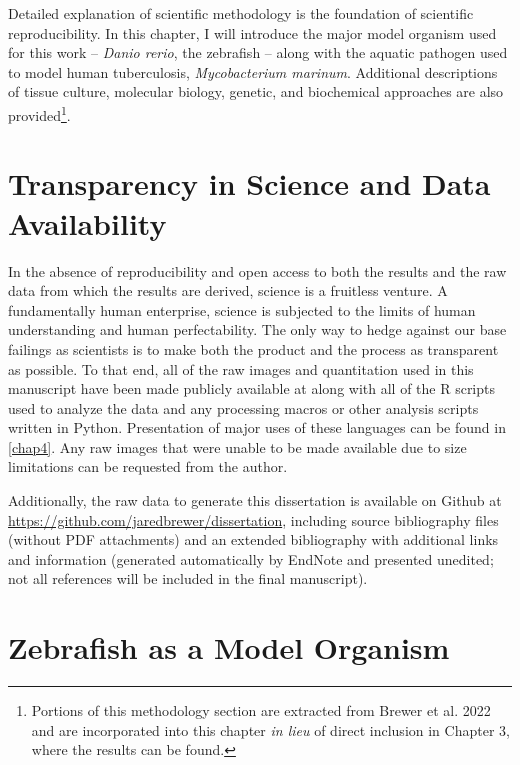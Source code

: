 Detailed explanation of scientific methodology is the foundation of scientific reproducibility. In this chapter, I will introduce the major model organism used for this work -- \textit{Danio rerio}, the zebrafish -- along with the aquatic pathogen used to model human tuberculosis, \textit{Mycobacterium marinum}. Additional descriptions of tissue culture, molecular biology, genetic, and biochemical approaches are also provided\footnote{Portions of this methodology section are extracted from Brewer et al. 2022 and are incorporated into this chapter \textit{in lieu} of direct inclusion in Chapter 3, where the results can be found.}. 

\section{Transparency in Science and Data Availability}\label{transparency}

In the absence of reproducibility and open access to both the results and the raw data from which the results are derived, science is a fruitless venture. A fundamentally human enterprise, science is subjected to the limits of human understanding and human perfectability. The only way to hedge against our base failings as scientists is to make both the product and the process as transparent as possible. To that end, all of the raw images and quantitation used in this manuscript have been made publicly available at \href{https://doi.org/10.5281/zenodo.6816429}{\citet{NFATZenodo2022}} along with all of the R scripts used to analyze the data and any processing macros or other analysis scripts written in Python. Presentation of major uses of these languages can be found in \autoref{chap4}. Any raw images that were unable to be made available due to size limitations can be requested from the author. 

Additionally, the raw data to generate this dissertation is available on Github at \url{https://github.com/jaredbrewer/dissertation}, including source bibliography files (without PDF attachments) and an extended bibliography with additional links and information (generated automatically by EndNote and presented unedited; not all references will be included in the final manuscript).

\section{Zebrafish as a Model Organism}\label{zebrafish}

